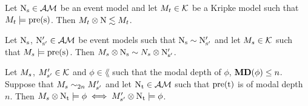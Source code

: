 \begin{lemma} \label{eventModelsRefine}
Let $ \mathrm{N_s}  \in \mathcal{AM}$ be an event model and let $M_t \in \mathcal{K}$ be a Kripke
model such that $M_t \models  \mathrm{pre(s)} $.
Then $M_t \otimes  \mathrm{N}  \lesssim M_t$.
\end{lemma}

\begin{lemma} \label{eventModelEquivalent}
Let $ \mathrm{N_s} $, $ \mathrm{N'_{s'}}  \in \mathcal{AM}$ be event models such that $ \mathrm{N_s} 
\sim  \mathrm{N'_{s'}} $
and let $M_s \in \mathcal{K}$ such that $M_s \models  \mathrm{pre(s)} $.
Then $M_s \otimes  \mathrm{N_s}  \sim N_s \otimes  \mathrm{N'_{s'}} $.
\end{lemma}

\begin{lemma} \label{nBisimilarKripkeExec}
Let $M_s$, $M'_{s'} \in \mathcal{K}$ and $\phi \in \lang$ such that the modal depth of $\phi$,
${\bf MD}(\phi) \leq n$.
Suppose that $M_s \sim_{2n} M'_{s'}$ and let $ \mathrm{N_t}  \in
\mathcal{AM}$ such that $ \mathrm{pre(t)} $ is of modal depth $n$.
Then $M_s \otimes  \mathrm{N_t}  \models \phi \iff M'_{s'} \otimes  \mathrm{N_t}  \models \phi$.
\end{lemma}

